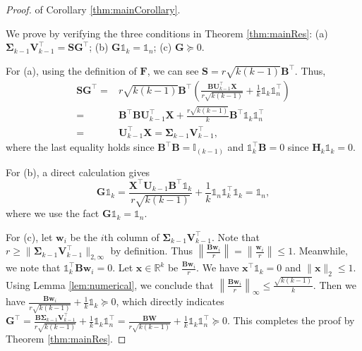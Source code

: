 \documentclass[journal]{IEEEtran}
\begin{document}
\begin{proof} of Corollary \ref{thm:mainCorollary}.
	
	We prove by verifying the three conditions in Theorem \ref{thm:mainRes}: (a) $\mathbf{\Sigma}_{k-1}\mathbf{V}_{k-1}^\top=\mathbf{S}\mathbf{G}^\top$; 
	(b) $\mathbf{G}\mathbb{1}_k = \mathbb{1}_n$;
	(c) $\mathbf{G}\succeq 0$.
	
	For (a), using the definition of $\mathbf{F}$, we can see $\mathbf{S} = r\sqrt{k(k-1)}\mathbf{B}^\top$.
	Thus, 
	\[
	\begin{aligned}
	\mathbf{SG}^\top =& r\sqrt{k(k-1)}\mathbf{B}^\top \left(\frac{\mathbf{B}\mathbf{U}_{k-1}^\top\mathbf{X}}{r\sqrt{k(k-1)}}+\frac{1}{k}\mathbb{1}_k\mathbb{1}_n^\top\right) \\
	=& \mathbf{B}^\top\mathbf{B}\mathbf{U}_{k-1}^\top\mathbf{X}+\frac{r\sqrt{k(k-1)}}{k}\mathbf{B}^\top\mathbb{1}_k\mathbb{1}_n^\top \\
	=& \mathbf{U}_{k-1}^\top\mathbf{X} = \mathbf{\Sigma}_{k-1}\mathbf{V}_{k-1}^\top,
	\end{aligned}
	\]
	where the last equality holds since $\mathbf{B}^\top\mathbf{B}=\mathbb{I}_{(k-1)}$ and $\mathbb{1}_k^\top\mathbf{B}=0$ since $\mathbf{H}_k \mathbb{1}_k=0$.
	
	
	For (b), a direct calculation gives
	\[
	\mathbf{G}\mathbb{1}_k = \frac{\mathbf{X}^\top \mathbf{U}_{k-1} \mathbf{B}^\top \mathbb{1}_k}{r\sqrt{k(k-1)}}+\frac{1}{k}\mathbb{1}_n\mathbb{1}_k^\top\mathbb{1}_k = \mathbb{1}_n,
	\]
	where we use the fact $\mathbf{G}\mathbb{1}_k = \mathbb{1}_n$.
	
	For (c), let $\mathbf{w}_i$ be the $i$th column of $\mathbf{\Sigma}_{k-1}\mathbf{V}_{k-1}^\top$.
	Note that $r \geq \| \mathbf{\Sigma}_{k-1}\mathbf{V}_{k-1}^\top \|_{2,\infty}$ by definition.
	Thus $\left\| \frac{\mathbf{B} \mathbf{w}_i}{r}\right\| = \left\| \frac{\mathbf{w}_i }{r} \right\| \leq 1$.
	Meanwhile, we note that $\mathbb{1}_k^\top \mathbf{B}\mathbf{w}_i = 0$. 
	Let $\mathbf{x} \in \mathbb{R}^k$ be $\frac{\mathbf{B}\mathbf{w}_i}{r}$.
	We have $\mathbf{x}^\top\mathbb{1}_k = 0$ and $\|\mathbf{x}\|_2\leq 1$.
	Using Lemma \ref{lem:numerical}, we conclude that $\left\|\frac{\mathbf{B}\mathbf{w}_i}{r}\right\|_\infty \leq \frac{\sqrt{k(k-1)}}{k}$.
	Then we have $\frac{\mathbf{B}\mathbf{w}_i}{r\sqrt{k(k-1)}} + \frac{1}{k}\mathbb{1}_k \succeq 0$,
	which directly indicates 
	$\mathbf{G}^\top = \frac{\mathbf{B}\mathbf{\Sigma}_{k-1}\mathbf{V}_{k-1}^\top}{r\sqrt{k(k-1)}} + \frac{1}{k}\mathbb{1}_k\mathbb{1}_n^\top = \frac{\mathbf{B}\mathbf{W}}{r\sqrt{k(k-1)}} + \frac{1}{k}\mathbb{1}_k\mathbb{1}_n^\top \succeq 0$.
	This completes the proof by Theorem \ref{thm:mainRes}.
\end{proof}
\end{document}
